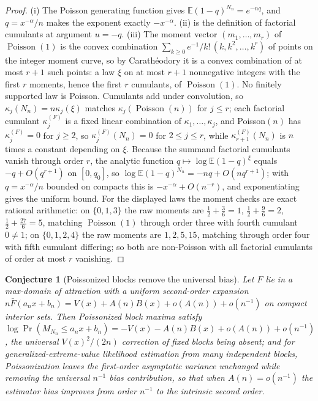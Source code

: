 \documentclass[11pt]{article}
\newtheorem{conjecture}{Conjecture}
\theoremstyle{definition}
\newcommand{\E}{\mathbb E}
\providecommand{\E}{\mathbb E}
\begin{document}
\begin{proof}
(i) The Poisson generating function gives $\E(1-q)^{N_n}=e^{-nq}$, and $q=x^{-\alpha}/n$ makes the exponent exactly $-x^{-\alpha}$.  (ii) is the definition of factorial cumulants at argument $u=-q$.  (iii) The moment vector $(m_1,\ldots,m_r)$ of $\operatorname{Poisson}(1)$ is the convex combination $\sum_{k\ge0}e^{-1}/k!\,(k,k^2,\ldots,k^r)$ of points on the integer moment curve, so by Carath\'eodory it is a convex combination of at most $r+1$ such points: a law $\xi$ on at most $r+1$ nonnegative integers with the first $r$ moments, hence the first $r$ cumulants, of $\operatorname{Poisson}(1)$.  No finitely supported law is Poisson.  Cumulants add under convolution, so $\kappa_j(N_n)=n\kappa_j(\xi)$ matches $\kappa_j(\operatorname{Poisson}(n))$ for $j\le r$; each factorial cumulant $\kappa_j^{(F)}$ is a fixed linear combination of $\kappa_1,\ldots,\kappa_j$, and Poisson$(n)$ has $\kappa_j^{(F)}=0$ for $j\ge2$, so $\kappa_j^{(F)}(N_n)=0$ for $2\le j\le r$, while $\kappa_{r+1}^{(F)}(N_n)$ is $n$ times a constant depending on $\xi$.  Because the summand factorial cumulants vanish through order $r$, the analytic function $q\mapsto\log\E(1-q)^{\xi}$ equals $-q+O(q^{r+1})$ on $[0,q_0]$, so $\log\E(1-q)^{N_n}=-nq+O(nq^{r+1})$; with $q=x^{-\alpha}/n$ bounded on compacts this is $-x^{-\alpha}+O(n^{-r})$, and exponentiating gives the uniform bound.  For the displayed laws the moment checks are exact rational arithmetic: on $\{0,1,3\}$ the raw moments are $\tfrac12+\tfrac36=1$, $\tfrac12+\tfrac96=2$, $\tfrac12+\tfrac{27}6=5$, matching $\operatorname{Poisson}(1)$ through order three with fourth cumulant $0\ne1$; on $\{0,1,2,4\}$ the raw moments are $1,2,5,15$, matching through order four with fifth cumulant differing; so both are non-Poisson with all factorial cumulants of order at most $r$ vanishing.
\end{proof}

\begin{conjecture}[Poissonized blocks remove the universal bias]\label{ah11}
Let $F$ lie in a max-domain of attraction with a uniform second-order expansion $n\bar F(a_nx+b_n)=V(x)+A(n)B(x)+o(A(n))+o(n^{-1})$ on compact interior sets.  Then Poissonized block maxima satisfy $\log\Pr(M_{N_n}\le a_nx+b_n)=-V(x)-A(n)B(x)+o(A(n))+o(n^{-1})$, the universal $V(x)^2/(2n)$ correction of fixed blocks being absent; and for generalized-extreme-value likelihood estimation from many independent blocks, Poissonization leaves the first-order asymptotic variance unchanged while removing the universal $n^{-1}$ bias contribution, so that when $A(n)=o(n^{-1})$ the estimator bias improves from order $n^{-1}$ to the intrinsic second order.
\end{conjecture}
\end{document}
